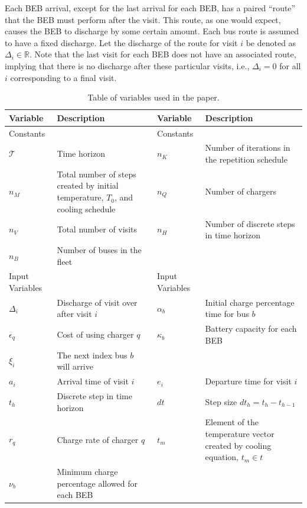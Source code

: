 \documentclass[energies,article,submit,moreauthors]{Definitions/mdpi}
\newcommand{\T}{\mathcal{T}}                %
\newcommand{\Tau}{T}                        %
\begin{document}
Each BEB arrival, except for the last arrival for each BEB, has a paired ``route'' that the BEB must perform after the
visit. This route, as one would expect, causes the BEB to discharge by some certain amount. Each bus route is assumed to
have a fixed discharge. Let the discharge of the route for visit \(i\) be denoted as \(\Delta_i \in \mathbb{R}\). Note that the last visit
for each BEB does not have an associated route, implying that there is no discharge after these particular visits, i.e.,
\(\Delta_i = 0\) for all \(i\) corresponding to a final visit.

\begin{table}[htbp]
\caption{\label{tab:sa-variables}Table of variables used in the paper.}
\centering
\begin{tabularx}{\textwidth}{L{0.3} L{1.2} L{0.3} L{1.2}}
\textbf{Variable} & \textbf{Description} & \textbf{Variable} & \textbf{Description}\\[0pt]
\hline
Constants &  & Constants & \\[0pt]
\(\T\) & Time horizon & \(n_K\) & Number of iterations in the repetition schedule\\[0pt]
\(n_M\) & Total number of steps created by initial temperature, \(\Tau_0\), and cooling schedule & \(n_Q\) & Number of chargers\\[0pt]
\(n_V\) & Total number of visits & \(n_H\) & Number of discrete steps in time horizon\\[0pt]
\(n_B\) & Number of buses in the fleet &  & \\[0pt]
\hline
Input Variables &  & Input Variables & \\[0pt]
\(\Delta_i\) & Discharge of visit over after visit \(i\) & \(\alpha_b\) & Initial charge percentage time for bus \(b\)\\[0pt]
\(\epsilon_q\) & Cost of using charger \(q\) & \(\kappa_b\) & Battery capacity for each BEB\\[0pt]
\(\xi_i\) & The next index bus \(b\) will arrive &  & \\[0pt]
\(a_i\) & Arrival time of visit \(i\) & \(e_i\) & Departure time for visit \(i\)\\[0pt]
\(t_h\) & Discrete step in time horizon & \(dt\) & Step size \(dt_h = t_h - t_{h-1}\)\\[0pt]
\(r_q\) & Charge rate of charger \(q\) & \(t_m\) & Element of the temperature vector created by cooling equation, \(t_m \in t\)\\[0pt]
\(\nu_b\) & Minimum charge percentage allowed for each BEB &  & \\[0pt]

\end{tabularx}
\end{table}
\end{document}
